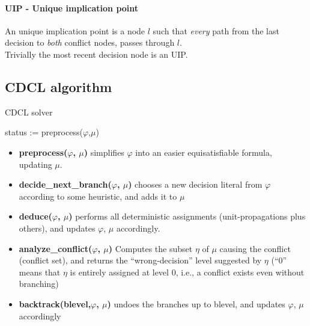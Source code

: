 \documentclass{article}
\begin{document}
\paragraph{UIP - Unique implication point}
An unique implication point is a node $l$ such that \textit{every} path from the last decision to \textit{both} conflict nodes, passes through $l$.\\Trivially the most recent decision node is an UIP.

\subsection{CDCL algorithm}
\begin{algorithm}[ht]
    \caption{CDCL solver}
    status := preprocess($\varphi$,$\mu$)\;
\end{algorithm}
\begin{itemize}
    \item \textbf{preprocess($\varphi$, $\mu$)} simplifies $\varphi$ into an easier equisatisfiable formula, updating $\mu$.
    \item \textbf{decide\_next\_branch($\varphi$, $\mu$)} chooses a new decision literal from $\varphi$ according to some heuristic, and adds it to $\mu$
    \item \textbf{deduce($\varphi$, $\mu$)} performs all deterministic assignments (unit-propagations plus others), and updates $\varphi$, $\mu$ accordingly.
    \item \textbf{analyze\_conflict($\varphi$, $\mu$)} Computes the subset $\eta$ of $\mu$ causing the conflict (conflict set), and returns the “wrong-decision” level suggested by $\eta$ (“0” means that $\eta$ is entirely assigned at level 0, i.e., a conflict exists even without branching)
    \item \textbf{backtrack(blevel,$\varphi$, $\mu$)} undoes the branches up to blevel, and updates $\varphi$, $\mu$ accordingly
\end{itemize}
\end{document}
